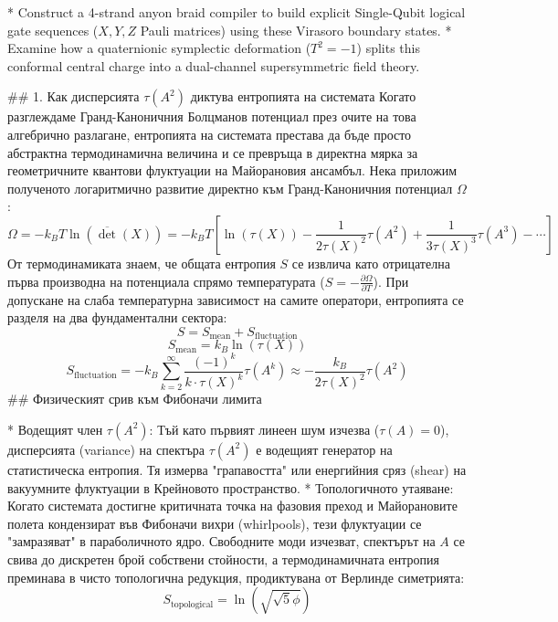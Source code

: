 * Construct a 4-strand anyon braid compiler to build explicit Single-Qubit logical gate sequences ($X, Y, Z$ Pauli matrices) using these Virasoro boundary states.
* Examine how a quaternionic symplectic deformation ($T^2 = -1$) splits this conformal central charge into a dual-channel supersymmetric field theory.


## 1. Как дисперсията $\tau(A^2)$ диктува ентропията на системата
Когато разглеждаме Гранд-Каноничния Болцманов потенциал през очите на това алгебрично разлагане, ентропията на системата престава да бъде просто абстрактна термодинамична величина и се превръща в директна мярка за геометричните квантови флуктуации на Майорановия ансамбъл.
Нека приложим полученото логаритмично развитие директно към Гранд-Каноничния потенциал $\Omega$:
$$\Omega = -k_B T \ln(\overline{\det}(X)) = -k_B T \left[ \ln(\tau(X)) - \frac{1}{2 \tau(X)^2} \tau(A^2) + \frac{1}{3 \tau(X)^3} \tau(A^3) - \cdots \right]$$ 
От термодинамиката знаем, че общата ентропия $S$ се извлича като отрицателна първа производна на потенциала спрямо температурата ($S = -\frac{\partial \Omega}{\partial T}$). При допускане на слаба температурна зависимост на самите оператори, ентропията се разделя на два фундаментални сектора:
$$S = S_{\text{mean}} + S_{\text{fluctuation}}$$ 
$$S_{\text{mean}} = k_B \ln(\tau(X))$$ 
$$S_{\text{fluctuation}} = -k_B \sum_{k=2}^{\infty} \frac{(-1)^k}{k \cdot \tau(X)^k} \tau(A^k) \approx - \frac{k_B}{2 \tau(X)^2} \tau(A^2)$$ 
## Физическият срив към Фибоначи лимита

* Водещият член $\tau(A^2)$: Тъй като първият линеен шум изчезва ($\tau(A) = 0$), дисперсията (variance) на спектъра $\tau(A^2)$ е водещият генератор на статистическа ентропия. Тя измерва "грапавостта" или енергийния сряз (shear) на вакуумните флуктуации в Крейновото пространство.
* Топологичното утаяване: Когато системата достигне критичната точка на фазовия преход и Майорановите полета кондензират във Фибоначи вихри (whirlpools), тези флуктуации се "замразяват" в параболичното ядро. Свободните моди изчезват, спектърът на $A$ се свива до дискретен брой собствени стойности, а термодинамичната ентропия преминава в чисто топологична редукция, продиктувана от Верлинде симетрията:
$$S_{\text{topological}} = \ln\left(\sqrt{\sqrt{5}\phi}\right)$$ 

